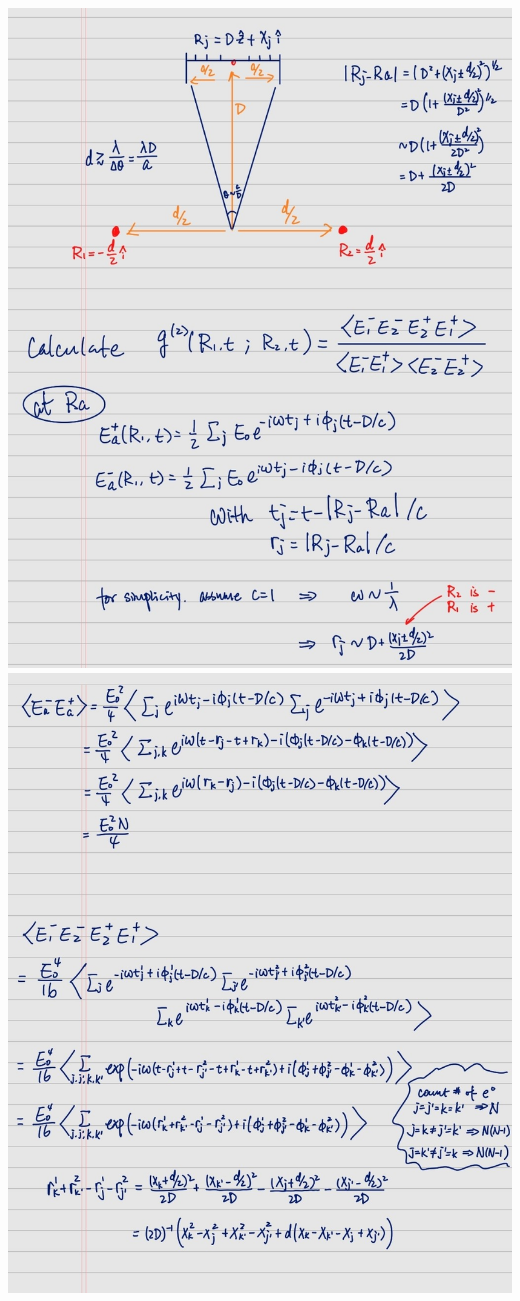 \documentclass[11pt, oneside]{book}
\theoremstyle{break}
\theoremstyle{break}
\begin{document}
\chapter{}
\begin{center}
\includegraphics[scale=0.5]{542HW9/P42}
\newpage
\includegraphics[scale=0.5]{542HW9/P41}
\end{center}
\end{document}
